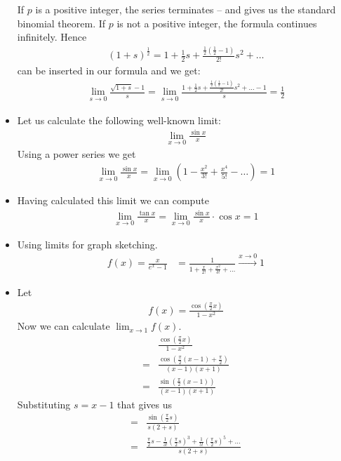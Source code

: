 \begin{ex}
\begin{itemize}
If $p$ is a positive integer, the series terminates -- and gives us the standard binomial theorem. If $p$ is not a positive integer, the formula continues infinitely. Hence 
\begin{align*}
(1+s)^{\frac 1 2} = 1 + \frac 1 2 s + \frac{\frac 1 2 ( \frac 1 2 -1)}{2!} s^2 + \dots
\end{align*}
can be inserted in our formula and we get:
\begin{align*}
\lim_{s \to 0} \frac{\sqrt{1+s}-1}{s} = \lim_{s \to 0} \frac{1 + \frac 1 2 s + \frac{\frac 1 2 \left( \frac 1 2 -1 \right)}{2!} s^2 + \dots -1}{s} =  \frac 1 2
\end{align*}
\item Let us calculate the following well-known limit:
\begin{align*}
\lim_{x\to 0} \frac{\sin x}{x}
\end{align*}
Using a power series we get
\begin{align*}
\lim_{x\to 0} \frac{\sin x}{x} = \lim_{x\to 0} \left(1-\frac{x^2}{3!} + \frac{x^4}{5!} - \dots\right) = 1
\end{align*}
\item Having calculated this limit we can compute
\begin{align*}
\lim_{x \to 0} \frac{\tan x}{x} = \lim_{x \to 0} \frac{\sin x}{x} \cdot \cos x = 1
\end{align*}
\item
Using limits for graph sketching.
\begin{align*}
f(x) = \frac x {e^x-1}
& = \frac 1 {1 + \frac x {2!} + \frac{x^2}{3!} + \dots}
 \overset{x\to 0}{\to} 1 
\end{align*}
\item Let
\begin{align*}
f(x) = \frac{\cos \left( \frac \pi 2 x \right) }{ 1-x^2}
\end{align*}
Now we can calculate $\lim_{x \to 1} f(x)$.
\begin{align*}
& \frac{\cos \left( \frac \pi 2 x \right) }{ 1-x^2} \\ 
= & \frac{\cos\left( \frac \pi 2 (x-1) + \frac \pi 2\right)}{ (x-1)(x+1)} \\
= & \frac{\sin\left(\frac \pi 2(x-1) \right) }{(x-1)(x+1)}
\end{align*}
Substituting $s=x-1$ that gives us
\begin{align*}
= & \frac{\sin \left(\frac \pi 2 s\right)}{s(2+s)} \\
= & \frac{\frac \pi 2 s - \frac 1 {3!} \left( \frac \pi 2 s \right)^3 + \frac 1 {5!} \left( \frac \pi 2 s \right)^5 + \dots}{s(2+s)} \\

\end{align*}
\end{itemize}
\end{ex}
